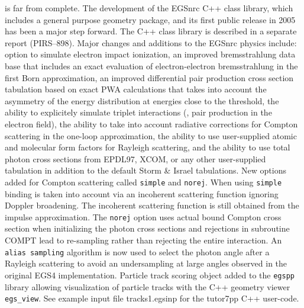 is far from complete. The development of the EGSnrc C++ class
library, which includes a general purpose geometry package, and its
first public release in 2005 has been a major step forward.
The C++ class library is described in a separate report (PIRS--898).
Major changes and additions to the EGSnrc physics include:
option to simulate electron impact ionization, an improved
bremsstrahlung data base that includes an exact evaluation of
electron-electron bremsstrahlung in the first Born approximation,
an improved differential pair production cross section tabulation
based on exact PWA calculations that takes into account the asymmetry
of the energy distribution at energies close to the threshold,
the ability to explicitely
simulate triplet interactions (\ie, pair production in the electron field),
the ability to take into account radiative corrections for Compton
scattering in the one-loop approximation, the ability to use
user-supplied atomic and molecular form factors for Rayleigh scattering,
and the ability to use total photon cross sections from EPDL97, XCOM, or
any other user-supplied tabulation in addition to the default
Storm \& Israel tabulations.
New options added for Compton scattering called {\tt simple} and
{\tt norej}. When using {\tt simple} binding is taken
into account via an incoherent scattering function
ignoring Doppler broadening. The incoherent scattering function
is still obtained from the impulse approximation.
The {\tt norej} option uses actual bound Compton cross section
when initializing the photon cross sections and rejections in
subroutine COMPT lead to re-sampling rather than rejecting the
entire interaction.
An {\tt alias sampling} algorithm is now used to select the
photon angle after a Rayleigh scattering to avoid an undersampling
at large angles observed in the original EGS4 implementation.
Particle track scoring object added to the {\tt egspp} library
allowing visualization of particle tracks with the C++ geometry
viewer {\tt egs\_view}. See example input file tracks1.egsinp for
the tutor7pp C++ user-code.

